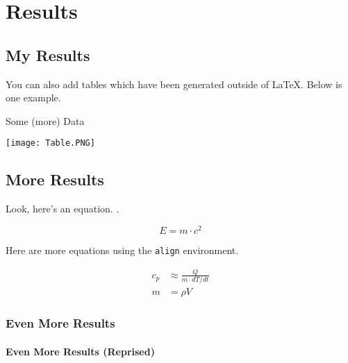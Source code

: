\chapter{Results}
\label{ch:Results}

\section{My Results}

You can also add tables which have been generated outside of \LaTeX. Below is one example.

\begin{table}[h]
\centering
\caption{Some (more) Data}
\label{tab:more data}
\texttt{[image: Table.PNG]}
\end{table}

\section{More Results}

Look, here's an equation. \cite{Bill2220}.

\begin{equation}
    E = m \cdot c^2
\end{equation}

Here are more equations using the \texttt{align} environment.

\begin{align}
    c_p &\approx \frac{Q}{m \cdot dT/dt} \\
    m &= \rho V
\end{align}

\subsection{Even More Results}

\lipsum[1]

\subsubsection{Even More Results (Reprised)}
